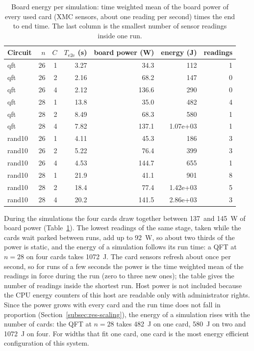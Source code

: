 \documentclass[pdflatex,sn-mathphys-num]{sn-jnl}
\newcommand{\NumEnergyIdleFour}{92}
\newcommand{\NumEnergyPowerMaxFour}{145}
\newcommand{\NumEnergyPowerMinFour}{137}
\newcommand{\NumEnergyQftTwentyEightFour}{1072}
\newcommand{\NumEnergyQftTwentyEightOne}{482}
\newcommand{\NumEnergyQftTwentyEightTwo}{580}
\theoremstyle{thmstyleone}
\theoremstyle{thmstylethree}
\begin{document}
\begin{table}[t]
\caption{Board energy per simulation: time weighted mean of the board power of every used card (XMC sensors, about
one reading per second) times the end to end time. The last column is the smallest number of sensor readings
inside one run.}\label{tab:energy}
\begin{tabular}{@{}lrrrrrr@{}}
\toprule
Circuit & $n$ & $C$ & $T_{\mathrm{e2e}}$ (s) & board power (W) & energy (J) & readings \\
\midrule
qft & 26 & 1 & 3.27 & 34.3 & 112 & 1 \\
qft & 26 & 2 & 2.16 & 68.2 & 147 & 0 \\
qft & 26 & 4 & 2.12 & 136.6 & 290 & 0 \\
qft & 28 & 1 & 13.8 & 35.0 & 482 & 4 \\
qft & 28 & 2 & 8.49 & 68.3 & 580 & 1 \\
qft & 28 & 4 & 7.82 & 137.1 & 1.07e+03 & 1 \\
rand10 & 26 & 1 & 4.11 & 45.3 & 186 & 3 \\
rand10 & 26 & 2 & 5.22 & 76.4 & 399 & 3 \\
rand10 & 26 & 4 & 4.53 & 144.7 & 655 & 1 \\
rand10 & 28 & 1 & 21.9 & 41.1 & 901 & 8 \\
rand10 & 28 & 2 & 18.4 & 77.4 & 1.42e+03 & 5 \\
rand10 & 28 & 4 & 20.2 & 141.5 & 2.86e+03 & 3 \\
\bottomrule
\end{tabular}
\end{table}

During the simulations the four cards draw together between \NumEnergyPowerMinFour~and \NumEnergyPowerMaxFour~W of
board power (Table~\ref{tab:energy}). The lowest readings of the same stage, taken while the cards wait parked
between runs, add up to \NumEnergyIdleFour~W, so about two thirds of the power is static, and the energy of a
simulation follows its run time: a QFT at $n=28$ on four cards takes \NumEnergyQftTwentyEightFour~J. The card sensors
refresh about once per second, so for runs of a few seconds the power is the time weighted mean of the readings in force during the run (zero to three new ones);
the table gives the number of readings inside the shortest run. Host power is not included because the CPU energy
counters of this host are readable only with administrator rights. Since the power grows with every card and the run time does not fall in proportion
(Section~\ref{subsec:res-scaling}), the energy of a simulation rises with the number of cards: the QFT at $n=28$
takes \NumEnergyQftTwentyEightOne~J on one card, \NumEnergyQftTwentyEightTwo~J on two and
\NumEnergyQftTwentyEightFour~J on four. For widths that fit one card, one card is the most energy efficient
configuration of this system.
\end{document}
